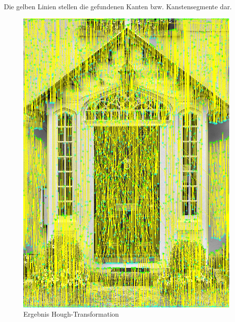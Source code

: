 Die gelben Linien stellen die gefundenen Kanten bzw. Kanstensegmente dar.
\pagebreak

\begin{figure}[!ht]
\centering
\includegraphics[scale=0.6]{images/hough-raw-segments} 
\caption{Ergebnis Hough-Transformation}
\label{fig:hough-raw-segments}
\end{figure}

\pagebreak

